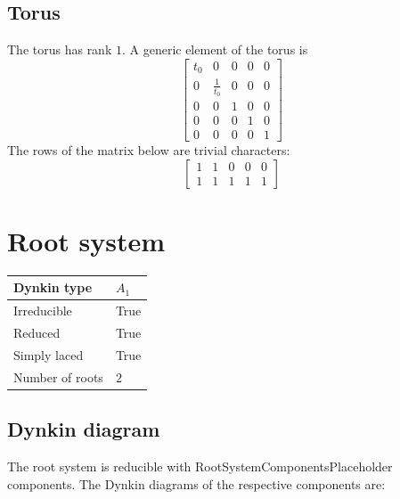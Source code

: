 \documentclass[11pt]{article}
\theoremstyle{definition}
\newif\ifrootsystemirreducible
\begin{document}
\subsection{Torus}

The torus has rank $1$. A generic element of the torus is
\[
\left[\begin{matrix}t_{0} & 0 & 0 & 0 & 0\\0 & \frac{1}{t_{0}} & 0 & 0 & 0\\0 & 0 & 1 & 0 & 0\\0 & 0 & 0 & 1 & 0\\0 & 0 & 0 & 0 & 1\end{matrix}\right]
\]
The rows of the matrix below are trivial characters:
\[
\left[\begin{matrix}1 & 1 & 0 & 0 & 0\\1 & 1 & 1 & 1 & 1\end{matrix}\right]
\]

\newpage
\section{Root system}

\begin{tabular}{|l|l|}
	\hline
    Dynkin type & $A_1$ \\
	\hline
    Irreducible & True \\
	\hline
    Reduced & True \\
	\hline
	Simply laced & True \\
	\hline
	Number of roots & $2$ \\
	\hline
\end{tabular}

\subsection{Dynkin diagram}

\ifrootsystemirreducible
The root system is irreducible and has Dynkin diagram:
\else
The root system is reducible with RootSystemComponentsPlaceholder components. The Dynkin diagrams of the respective components are:
\fi

\end{document}
